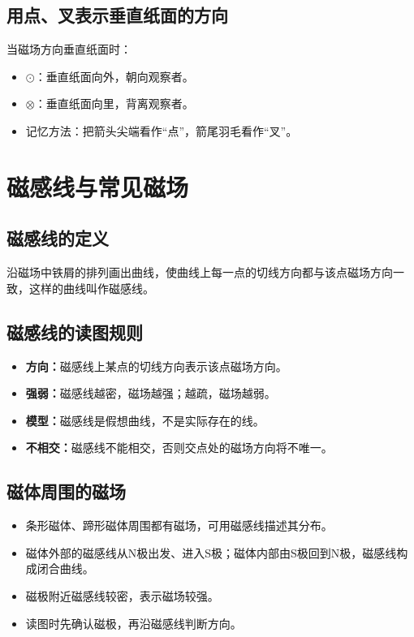 \documentclass[a4paper,12pt,twoside]{article}
\begin{document}
\subsection{用点、叉表示垂直纸面的方向}
当磁场方向垂直纸面时：
\begin{itemize}
    \item \(\odot\)：垂直纸面向外，朝向观察者。
    \item \(\otimes\)：垂直纸面向里，背离观察者。
    \item 记忆方法：把箭头尖端看作“点”，箭尾羽毛看作“叉”。
\end{itemize}


\section{磁感线与常见磁场}

\subsection{磁感线的定义}
沿磁场中铁屑的排列画出曲线，使曲线上每一点的切线方向都与该点磁场方向一致，这样的曲线叫作磁感线。

\subsection{磁感线的读图规则}
\begin{itemize}
    \item \textbf{方向：}磁感线上某点的切线方向表示该点磁场方向。
    \item \textbf{强弱：}磁感线越密，磁场越强；越疏，磁场越弱。
    \item \textbf{模型：}磁感线是假想曲线，不是实际存在的线。
    \item \textbf{不相交：}磁感线不能相交，否则交点处的磁场方向将不唯一。
\end{itemize}

\subsection{磁体周围的磁场}
\begin{itemize}
    \item 条形磁体、蹄形磁体周围都有磁场，可用磁感线描述其分布。
    \item 磁体外部的磁感线从N极出发、进入S极；磁体内部由S极回到N极，磁感线构成闭合曲线。
    \item 磁极附近磁感线较密，表示磁场较强。
    \item 读图时先确认磁极，再沿磁感线判断方向。
\end{itemize}
\end{document}
